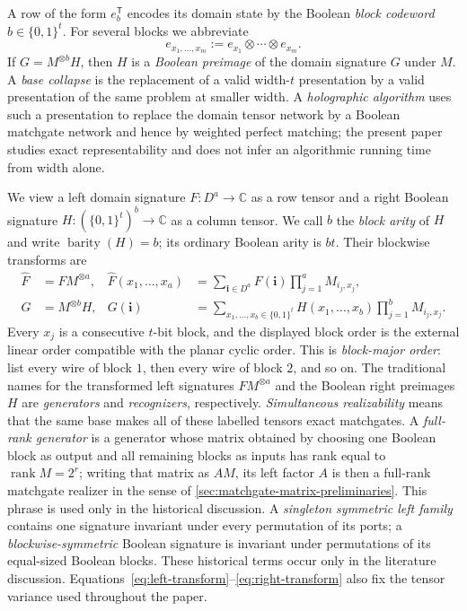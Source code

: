 \documentclass[11pt]{article}
\theoremstyle{definition}
\theoremstyle{remark}
\newcommand{\C}{\mathbb C}
\newcommand{\bits}{\{0,1\}}
\newcommand{\barity}{\operatorname{barity}}
\newcommand{\trans}{\mathsf T}
\newcommand{\rank}{\operatorname{rank}}
\begin{document}
A row of the form $e_b^{\trans}$ encodes its domain state by the Boolean
\emph{block codeword} $b\in\bits^t$.  For several blocks we abbreviate
\[
  e_{x_1,\ldots,x_m}:=e_{x_1}\otimes\cdots\otimes e_{x_m}.
\]
If $G=M^{\otimes b}H$, then $H$ is a \emph{Boolean preimage} of the domain
signature $G$ under $M$.  A \emph{base collapse} is the replacement of a
valid width-$t$ presentation by a valid presentation of the same problem at
smaller width.  A \emph{holographic algorithm} uses such a presentation to
replace the domain tensor network by a Boolean matchgate network and hence
by weighted perfect matching; the present paper studies exact
representability and does not infer an algorithmic running time from width
alone.

We view a left domain signature $F\colon D^a\to\C$ as a row tensor and a
right Boolean signature $H\colon(\bits^t)^b\to\C$ as a column tensor.  We
call $b$ the \emph{block arity} of $H$ and write $\barity(H)=b$; its
ordinary Boolean arity is $bt$.  Their blockwise transforms are
\begin{align}
  \widehat F
  &=F M^{\otimes a},
  &
  \widehat F(x_1,\ldots,x_a)
  &=\sum_{\mathbf i\in D^a}
      F(\mathbf i)\prod_{j=1}^a M_{i_j,x_j},
  \label{eq:left-transform}\\
  G
  &=M^{\otimes b}H,
  &
  G(\mathbf i)
  &=\sum_{x_1,\ldots,x_b\in\bits^t}
      H(x_1,\ldots,x_b)
      \prod_{j=1}^b M_{i_j,x_j}.
  \label{eq:right-transform}
\end{align}
Every $x_j$ is a consecutive $t$-bit block, and the displayed block order
is the external linear order compatible with the planar cyclic order.
This is \emph{block-major order}: list every wire of block $1$, then every
wire of block $2$, and so on.  The traditional names for the transformed
left signatures $FM^{\otimes a}$ and the Boolean right preimages $H$ are
\emph{generators} and \emph{recognizers}, respectively.  \emph{Simultaneous
realizability} means that the same base makes all of these labelled tensors
exact matchgates.  A \emph{full-rank generator} is a generator whose
matrix obtained by choosing one Boolean block as output and all remaining
blocks as inputs has rank equal to $\rank M=2^r$; writing that matrix as
$AM$, its left factor $A$ is then a full-rank matchgate realizer in the sense
of \cref{sec:matchgate-matrix-preliminaries}.  This phrase is used only in
the historical discussion.  A \emph{singleton
symmetric left family} contains one
signature invariant under every permutation of its ports; a
\emph{blockwise-symmetric} Boolean signature is invariant under permutations
of its equal-sized Boolean blocks.  These historical terms occur only in
the literature discussion.
Equations~\eqref{eq:left-transform}--\eqref{eq:right-transform} also fix the tensor
variance used throughout the paper.
\end{document}
